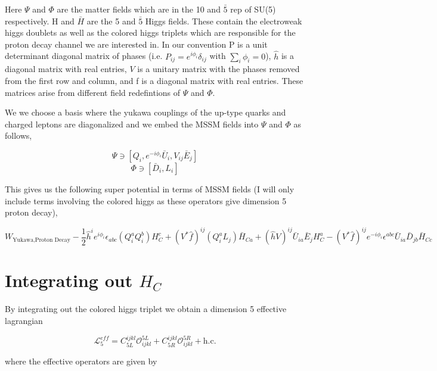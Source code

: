 \documentclass[aps,onecolumn,twoside,secnumarabic,balancelastpage,amsmath,amssymb,nofootinbib,hyperref=pdftex]{revtex4}
\begin{document}
Here $\Psi$ and $\Phi$ are the matter fields which are in the 10 and $\bar{5}$ rep of SU(5) respectively. H and $\bar{H}$ are the 5 and $\bar{5}$ Higgs fields. These contain the electroweak higgs doublets as well as the colored higgs triplets which are responsible for the proton decay channel we are interested in. In our convention P is a unit determinant diagonal matrix of phases (i.e. $P_{ij} = e^{i\phi_{i}}\delta_{ij}$ with $\sum_{i} \phi_{i} = 0$), $\hat{h}$ is a diagonal matrix with real entries, $V$ is a unitary matrix with the phases removed from the first row and column, and f is a diagonal matrix with real entries. These matrices arise from different field redefintions of $\Psi$ and $\Phi$. 

We we choose a basis where the yukawa couplings of the up-type quarks and charged leptons are diagonalized and we embed the MSSM fields into $\Psi$ and $\Phi$ as follows,

\begin{equation}
\Psi \ni [Q_i, e^{-i\phi_{i}}\bar{U}_{i}, V_{ij}\bar{E}_{j}]
\end{equation}
\begin{equation}
\Phi \ni [\bar{D}_{i}, L_{i}]
\end{equation}

This gives us the following super potential in terms of MSSM fields (I will only include terms involving the colored higgs as these operators give dimension 5 proton decay),

\begin{equation}
W_{\text{Yukawa,Proton Decay}}-\frac{1}{2}\hat{h}^{i}e^{i\phi_{i}}\epsilon_{abc}(Q^{a}_{i}Q^{b}_{i})H^{c}_{C} + (V^{*}\hat{f})^{ij}(Q^{a}_{i}L_{j})\bar{H}_{Ca} + (\hat{h}V)^{ij}\bar{U}_{ia}\bar{E}_{j}H^{a}_{C} - (V^{*}\hat{f})^{ij}e^{-i\phi_{i}}\epsilon^{abc}\bar{U}_{ia}\bar{D}_{jb}\bar{H}_{Cc}
\end{equation}

\section{Integrating out $H_{C}$}
By integrating out the colored higgs triplet we obtain a dimension 5 effective lagrangian

\begin{equation}
\mathcal{L}^{eff}_{5} = C^{ijkl}_{5L}\mathcal{O}^{5L}_{ijkl} + C^{ijkl}_{5R}\mathcal{O}^{5R}_{ijkl} + \text{h.c.}
\end{equation}

where the effective operators are given by
\end{document}
